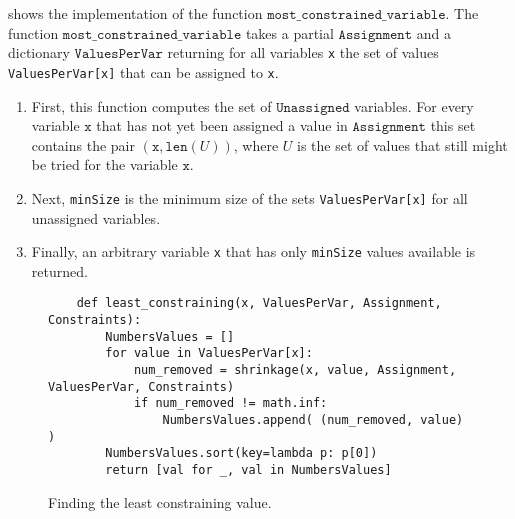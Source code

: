  shows the implementation of the function
$\texttt{most\_constrained\_variable}$.  The function $\texttt{most\_constrained\_variable}$ takes a partial 
$\texttt{Assignment}$ and a dictionary $\texttt{ValuesPerVar}$ returning for all variables \texttt{x} the set
of values \texttt{ValuesPerVar[x]} that can be assigned to \texttt{x}.
\begin{enumerate}
\item First, this function computes the set of $\texttt{Unassigned}$ variables.  For every variable $\texttt{x}$ that
      has not yet been assigned a value in $\texttt{Assignment}$ this set contains the pair 
      $(\texttt{x}, \texttt{len}(U))$, where $U$ is the set of values that still might be tried for the variable  $\texttt{x}$.
\item Next, \texttt{minSize} is the minimum size of the sets \texttt{ValuesPerVar[x]} for all unassigned variables.
\item Finally, an arbitrary variable \texttt{x} that has only \texttt{minSize} values available is returned.
\end{enumerate}

\begin{figure}[!ht]
\centering
\begin{verbatim}
    def least_constraining(x, ValuesPerVar, Assignment, Constraints):
        NumbersValues = []
        for value in ValuesPerVar[x]:
            num_removed = shrinkage(x, value, Assignment, ValuesPerVar, Constraints)
            if num_removed != math.inf:
                NumbersValues.append( (num_removed, value) )
        NumbersValues.sort(key=lambda p: p[0])
        return [val for _, val in NumbersValues]\end{verbatim}
\vspace*{-0.3cm}
\caption{Finding the least constraining value.}
\label{fig:Constraint-Propagation-Solver.ipynb:least_constraining}
\end{figure} 

